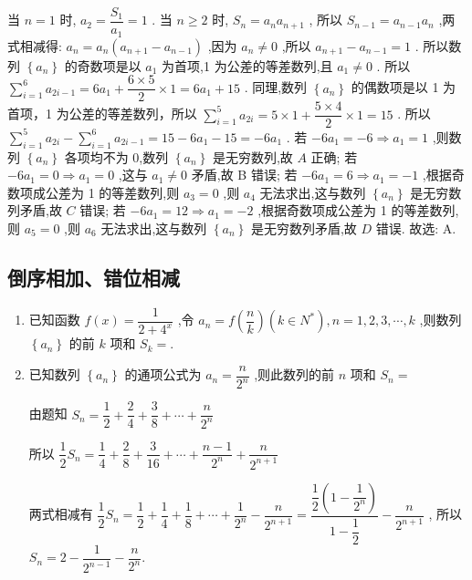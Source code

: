 \begin{enumerate}
\begin{jieda}
        当 $n = 1$ 时, ${a}_{2} = \dfrac{{S}_{1}}{{a}_{1}} = 1$ . 当 $n \geq  2$ 时, ${S}_{n} = {a}_{n}{a}_{n + 1}$ , 所以 ${S}_{n - 1} = {a}_{n - 1}{a}_{n}$ ,两式相减得: ${a}_{n} = {a}_{n}\left( {{a}_{n + 1} - {a}_{n - 1}}\right)$ ,因为 ${a}_{n} \neq  0$ ,所以 ${a}_{n + 1} - {a}_{n - 1} = 1$ . 所以数列 $\left\{  {a}_{n}\right\}$ 的奇数项是以 ${a}_{1}$ 为首项,1 为公差的等差数列,且 ${a}_{1} \neq  0$ . 所以 $\mathop{\sum }\limits_{{i = 1}}^{6}{a}_{{2i} - 1} =  6{a}_{1} + \dfrac{6 \times  5}{2} \times  1 = 6{a}_{1} + {15}$ . 同理,数列 $\left\{  {a}_{n}\right\}$ 的偶数项是以 1 为首项，1 为公差的等差数列，所以 $\mathop{\sum }\limits_{{i = 1}}^{5}{a}_{2i} = 5 \times  1 + \dfrac{5 \times  4}{2} \times  1 = {15}$ . 所以 $\mathop{\sum }\limits_{{i = 1}}^{5}{a}_{2i} - \mathop{\sum }\limits_{{i = 1}}^{6}{a}_{{2i} - 1} = {15} - 6{a}_{1} - {15} =  - 6{a}_{1}$ . 若 $- 6{a}_{1} =  - 6 \Longrightarrow  {a}_{1} = 1$ ,则数列 $\left\{  {a}_{n}\right\}$ 各项均不为 0,数列 $\left\{  {a}_{n}\right\}$ 是无穷数列,故 ${A}$ 正确; 若 $- 6{a}_{1} = 0 \Longrightarrow  {a}_{1} = 0$ ,这与 ${a}_{1} \neq  0$ 矛盾,故 B 错误; 若 $- 6{a}_{1} = 6 \Longrightarrow  {a}_{1} =  - 1$ ,根据奇数项成公差为 1 的等差数列,则 ${a}_{3} = 0$ ,则 ${a}_{4}$ 无法求出,这与数列 $\left\{  {a}_{n}\right\}$ 是无穷数列矛盾,故 ${C}$ 错误; 若 $- 6{a}_{1} = {12} \Longrightarrow  {a}_{1} =  - 2$ ,根据奇数项成公差为 1 的等差数列,则 ${a}_{5} = 0$ ,则 ${a}_{6}$ 无法求出,这与数列 $\left\{  {a}_{n}\right\}$ 是无穷数列矛盾,故 ${D}$ 错误. 故选: A.
    \end{jieda}
\end{enumerate}
\subsection*{倒序相加、错位相减}
\begin{enumerate}
    \item 已知函数 $f\left( x\right)  = \dfrac{1}{2 + 4^{x}}$ ,令 ${a}_{n} = f\left( \dfrac{n}{k}\right) \left( {k \in  {N}^{ * }}\right) ,n = 1,2,3,\cdots ,k$ ,则数列 $\left\{  {a}_{n}\right\}$ 的前 $k$ 项和 ${S}_{k} =$.
    \item 已知数列 $ \left\{  {a}_{n}\right\} $ 的通项公式为 $ {a}_{n} = \dfrac{n}{{2}^{n}} $ ,则此数列的前 $ n $ 项和 $ {S}_{n} = $
    \begin{jieda}
        由题知 $ {S}_{n} = \dfrac{1}{2} + \dfrac{2}{4} + \dfrac{3}{8} + \cdots  + \dfrac{n}{{2}^{n}} $
        
        所以 $ \dfrac{1}{2}{S}_{n} = \dfrac{1}{4} + \dfrac{2}{8} + \dfrac{3}{16} + \cdots  + \dfrac{n - 1}{{2}^{n}} + \dfrac{n}{{2}^{n + 1}} $ 
        
        两式相减有 $ \dfrac{1}{2}{S}_{n} = \dfrac{1}{2} + \dfrac{1}{4} + \dfrac{1}{8} + \cdots  + \dfrac{1}{{2}^{n}} - \dfrac{n}{{2}^{n + 1}} = \dfrac{\dfrac{1}{2}\left( {1 - \dfrac{1}{{2}^{n}}}\right) }{1 - \dfrac{1}{2}} - \dfrac{n}{{2}^{n + 1}} $ ,
        所以 $ {S}_{n} = 2 - \dfrac{1}{{2}^{n - 1}} - \dfrac{n}{{2}^{n}} $.
    \end{jieda}
\end{enumerate}
